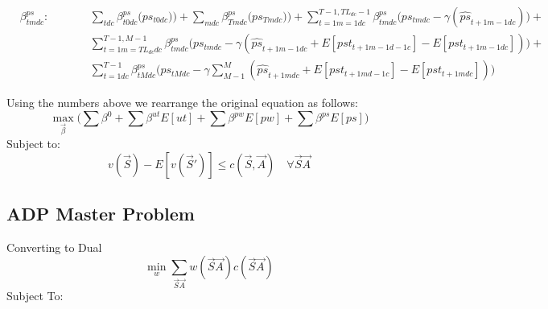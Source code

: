 \documentclass{article}
\begin{document}
\begin{fleqn}[\parindent]
\begin{equation}\begin{alignedat}{10}
& \beta^{ps}_{tmdc}: \qquad 
	&& \sum_{tdc} \beta_{t0dc}^{ps} \Big( ps_{t0dc}) \Big) + 
\sum_{mdc} \beta_{Tmdc}^{ps} \Big( ps_{Tmdc}) \Big) + 
	\sum_{t=1m=1dc}^{T-1, TL_{dc}-1} \beta_{tmdc}^{ps} 
	\Big( ps_{tmdc} - \gamma 
	(\hat{ps}_{t+1m-1dc}) \Big) + \\
&	&& 
	\sum_{t=1m=TL_{dc}dc}^{T-1,M-1} \beta_{tmdc}^{ps} 
	\Big( ps_{tmdc} - \gamma 
		(\hat{ps}_{t+1m-1dc} + E[pst_{t+1m-1d-1c}] - E[pst_{t+1m-1dc}]) \Big) + \\
&	&& \sum_{t=1dc}^{T-1} \beta_{tMdc}^{ps} 
	\Big( ps_{tMdc} - \gamma \sum_{M-1}^{M}
		(\hat{ps}_{t+1mdc} + E[pst_{t+1md-1c}] - E[pst_{t+1mdc}]) \Big)
\end{alignedat} \end{equation}
\end{fleqn}

Using the numbers above we rearrange the original equation as follows:
\begin{equation}
	\max_{\vec{\beta}} \Big( \sum \beta^{0} + \sum \beta^{ut} E[ut] + \sum \beta^{pw} E[pw] + \sum \beta^{ps} E[ps] \Big)
\end{equation}
Subject to:
\begin{equation}
	v(\vec{S}) - E[v(\vec{S}')] \le c(\vec{S}, \vec{A}) \quad \forall \vec{S} \vec{A} 
\end{equation}


\subsection{ADP Master Problem}
\label{Dual of ADP LP}
Converting to Dual
\begin{equation}
	\min_{w} \sum_{\vec{S} \vec{A}} w(\vec{S} \vec{A}) c(\vec{S} \vec{A})
\end{equation}
Subject To:
\end{document}
